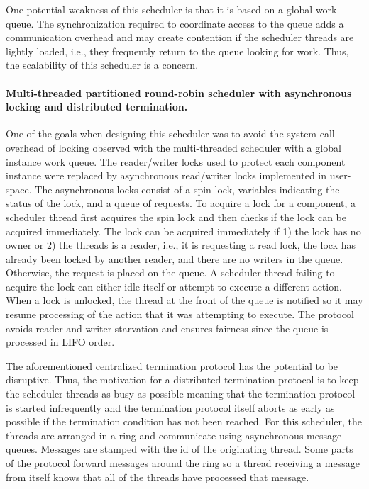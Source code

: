 One potential weakness of this scheduler is that it is based on a global work queue.
The synchronization required to coordinate access to the queue adds a communication overhead and may create contention if the scheduler threads are lightly loaded, i.e., they frequently return to the queue looking for work.
Thus, the scalability of this scheduler is a concern.

\paragraph{Multi-threaded partitioned round-robin scheduler with asynchronous locking and distributed termination.}
One of the goals when designing this scheduler was to avoid the system call overhead of locking observed with the multi-threaded scheduler with a global instance work queue.
The reader/writer locks used to protect each component instance were replaced by asynchronous read/writer locks implemented in user-space.
The asynchronous locks consist of a spin lock, variables indicating the status of the lock, and a queue of requests.
To acquire a lock for a component, a scheduler thread first acquires the spin lock and then checks if the lock can be acquired immediately.
The lock can be acquired immediately if 1) the lock has no owner or 2) the threads is a reader, i.e., it is requesting a read lock, the lock has already been locked by another reader, and there are no writers in the queue.
Otherwise, the request is placed on the queue.
A scheduler thread failing to acquire the lock can either idle itself or attempt to execute a different action.
When a lock is unlocked, the thread at the front of the queue is notified so it may resume processing of the action that it was attempting to execute.
The protocol avoids reader and writer starvation and ensures fairness since the queue is processed in LIFO order.

The aforementioned centralized termination protocol has the potential to be disruptive.
Thus, the motivation for a distributed termination protocol is to keep the scheduler threads as busy as possible meaning that the termination protocol is started infrequently and the termination protocol itself aborts as early as possible if the termination condition has not been reached.
For this scheduler, the threads are arranged in a ring and communicate using asynchronous message queues.
Messages are stamped with the id of the originating thread.
Some parts of the protocol forward messages around the ring so a thread receiving a message from itself knows that all of the threads have processed that message.

